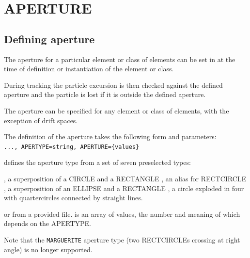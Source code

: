  
\chapter{APERTURE}
\label{chap:aperture}

\section{Defining aperture}
\label{sec:def_aper}
The aperture for a particular element or class of elements can be set in \madx
at the time of definition or instantiation of the element or class.

During tracking the particle excursion is then checked against the defined aperture and 
the particle is lost if it is outside the defined aperture.

The aperture can be specified for any element or class of elements, 
with the exception of drift spaces. 

The definition of the aperture takes the following form and parameters:\\
{\tt ..., APERTYPE=string,  APERTURE=\{values\}}


\begin{madlist}
   defines the aperture type from a set of seven
  preselected types:
    \begin{madlist}
      , a superposition of a CIRCLE and
        a RECTANGLE 
      , an alias for RECTCIRCLE
      , a superposition of an ELLIPSE and a
        RECTANGLE
      , a circle exploded in four with
      quartercircles connected by straight lines.  
    \end{madlist}
    or from a provided file.
   is an array of values, the number and meaning 
of which depends on the APERTYPE.  
\end{madlist}
Note that the {\tt MARGUERITE} aperture type (two RECTCIRCLEs crossing
at right angle) is no longer supported. 

